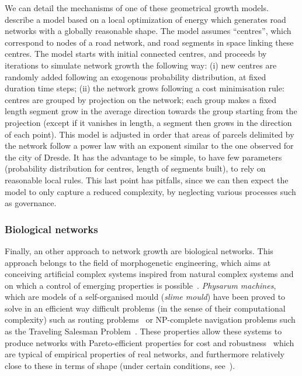 \documentclass[10pt]{article}
\begin{document}
We can detail the mechanisms of one of these geometrical growth models. \cite{barthelemy2008modeling} describe a model based on a local optimization of energy which generates road networks with a globally reasonable shape. The model assumes ``centres'', which correspond to nodes of a road network, and road segments in space linking these centres. The model starts with initial connected centres, and proceeds by iterations to simulate network growth the following way: (i) new centres are randomly added following an exogenous probability distribution, at fixed duration time steps; (ii) the network grows following a cost minimisation rule: centres are grouped by projection on the network; each group makes a fixed length segment grow in the average direction towards the group starting from the projection (except if it vanishes in length, a segment then grows in the direction of each point). This model is adjusted in order that areas of parcels delimited by the network follow a power law with an exponent similar to the one observed for the city of Dresde. It has the advantage to be simple, to have few parameters (probability distribution for centres, length of segments built), to rely on reasonable local rules. This last point has pitfalls, since we can then expect the model to only capture a reduced complexity, by neglecting various processes such as governance.



\subsubsection{Biological networks}

Finally, an other approach to network growth are biological networks. This approach belongs to the field of morphogenetic engineering, which aims at conceiving artificial complex systems inspired from natural complex systems and on which a control of emerging properties is possible~\cite{doursat2012morphogenetic}. \emph{Physarum machines}, which are models of a self-organised mould (\emph{slime mould}) have been proved to solve in an efficient way difficult problems (in the sense of their computational complexity) such as routing problems~\cite{tero2006physarum} or NP-complete navigation problems such as the Traveling Salesman Problem~\cite{zhu2013amoeba}. These properties allow these systems to produce networks with Pareto-efficient properties for cost and robustness~\cite{tero2010rules} which are typical of empirical properties of real networks, and furthermore relatively close to these in terms of shape (under certain conditions, see~\cite{adamatzky2010road}).
\end{document}

